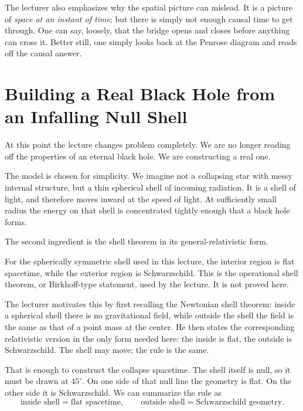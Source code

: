 The lecturer also emphasizes why the spatial picture can mislead. It is a picture of \emph{space at an instant of time}; but there is simply not enough causal time to get through. One can say, loosely, that the bridge opens and closes before anything can cross it. Better still, one simply looks back at the Penrose diagram and reads off the causal answer.

\section{Building a Real Black Hole from an Infalling Null Shell}

At this point the lecture changes problem completely. We are no longer reading off the properties of an eternal black hole. We are constructing a real one.

The model is chosen for simplicity. We imagine not a collapsing star with messy internal structure, but a thin spherical shell of incoming radiation. It is a shell of light, and therefore moves inward at the speed of light. At sufficiently small radius the energy on that shell is concentrated tightly enough that a black hole forms.

The second ingredient is the shell theorem in its general-relativistic form.

\begin{remark}
For the spherically symmetric shell used in this lecture, the interior region is flat spacetime, while the exterior region is Schwarzschild. This is the operational shell theorem, or Birkhoff-type statement, used by the lecture. It is not proved here.
\end{remark}

The lecturer motivates this by first recalling the Newtonian shell theorem: inside a spherical shell there is no gravitational field, while outside the shell the field is the same as that of a point mass at the center. He then states the corresponding relativistic version in the only form needed here: the inside is flat, the outside is Schwarzschild. The shell may move; the rule is the same.

That is enough to construct the collapse spacetime. The shell itself is null, so it must be drawn at \(45^\circ\). On one side of that null line the geometry is flat. On the other side it is Schwarzschild. We can summarize the rule as
\begin{equation}
\text{inside shell} = \text{flat spacetime},
\qquad
\text{outside shell} = \text{Schwarzschild geometry}.
\end{equation}

